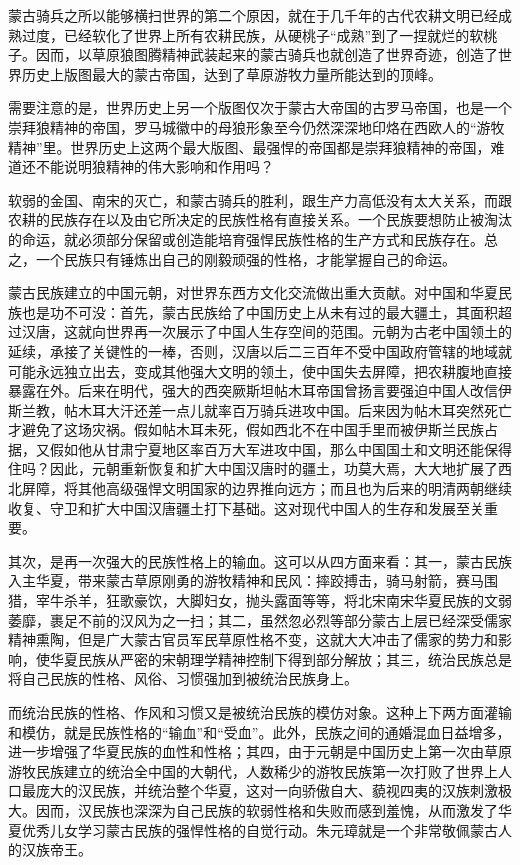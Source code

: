 \par 蒙古骑兵之所以能够横扫世界的第二个原因，就在于几千年的古代农耕文明已经成熟过度，已经软化了世界上所有农耕民族，从硬桃子“成熟”到了一捏就烂的软桃子。因而，以草原狼图腾精神武装起来的蒙古骑兵也就创造了世界奇迹，创造了世界历史上版图最大的蒙古帝国，达到了草原游牧力量所能达到的顶峰。
\par 需要注意的是，世界历史上另一个版图仅次于蒙古大帝国的古罗马帝国，也是一个崇拜狼精神的帝国，罗马城徽中的母狼形象至今仍然深深地印烙在西欧人的“游牧精神”里。世界历史上这两个最大版图、最强悍的帝国都是崇拜狼精神的帝国，难道还不能说明狼精神的伟大影响和作用吗？
\par 软弱的金国、南宋的灭亡，和蒙古骑兵的胜利，跟生产力高低没有太大关系，而跟农耕的民族存在以及由它所决定的民族性格有直接关系。一个民族要想防止被淘汰的命运，就必须部分保留或创造能培育强悍民族性格的生产方式和民族存在。总之，一个民族只有锤炼出自己的刚毅顽强的性格，才能掌握自己的命运。
\par 蒙古民族建立的中国元朝，对世界东西方文化交流做出重大贡献。对中国和华夏民族也是功不可没：首先，蒙古民族给了中国历史上从未有过的最大疆土，其面积超过汉唐，这就向世界再一次展示了中国人生存空间的范围。元朝为古老中国领土的延续，承接了关键性的一棒，否则，汉唐以后二三百年不受中国政府管辖的地域就可能永远独立出去，变成其他强大文明的领土，使中国失去屏障，把农耕腹地直接暴露在外。后来在明代，强大的西突厥斯坦帖木耳帝国曾扬言要强迫中国人改信伊斯兰教，帖木耳大汗还差一点儿就率百万骑兵进攻中国。后来因为帖木耳突然死亡才避免了这场灾祸。假如帖木耳未死，假如西北不在中国手里而被伊斯兰民族占据，又假如他从甘肃宁夏地区率百万大军进攻中国，那么中国国土和文明还能保得住吗？因此，元朝重新恢复和扩大中国汉唐时的疆土，功莫大焉，大大地扩展了西北屏障，将其他高级强悍文明国家的边界推向远方；而且也为后来的明清两朝继续收复、守卫和扩大中国汉唐疆土打下基础。这对现代中国人的生存和发展至关重要。
\par 其次，是再一次强大的民族性格上的输血。这可以从四方面来看：其一，蒙古民族入主华夏，带来蒙古草原刚勇的游牧精神和民风：摔跤搏击，骑马射箭，赛马围猎，宰牛杀羊，狂歌豪饮，大脚妇女，抛头露面等等，将北宋南宋华夏民族的文弱萎靡，裹足不前的汉风为之一扫；其二，虽然忽必烈等部分蒙古上层已经深受儒家精神熏陶，但是广大蒙古官员军民草原性格不变，这就大大冲击了儒家的势力和影响，使华夏民族从严密的宋朝理学精神控制下得到部分解放；其三，统治民族总是将自己民族的性格、风俗、习惯强加到被统治民族身上。
\par 而统治民族的性格、作风和习惯又是被统治民族的模仿对象。这种上下两方面灌输和模仿，就是民族性格的“输血”和“受血”。此外，民族之间的通婚混血日益增多，进一步增强了华夏民族的血性和性格；其四，由于元朝是中国历史上第一次由草原游牧民族建立的统治全中国的大朝代，人数稀少的游牧民族第一次打败了世界上人口最庞大的汉民族，并统治整个华夏，这对一向骄傲自大、藐视四夷的汉族刺激极大。因而，汉民族也深深为自己民族的软弱性格和失败而感到羞愧，从而激发了华夏优秀儿女学习蒙古民族的强悍性格的自觉行动。朱元璋就是一个非常敬佩蒙古人的汉族帝王。
